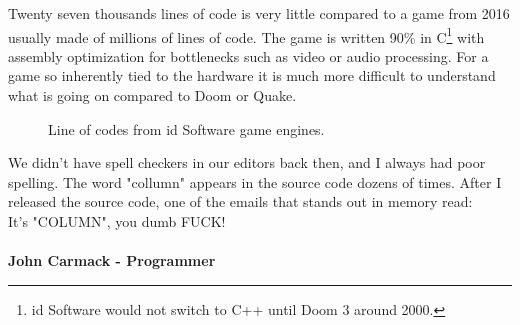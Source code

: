 \documentclass[book.tex]{subfiles}
\begin{document}
\par
Twenty seven thousands lines of code is very little compared to a game from 2016 usually made of millions of lines of code. The game is written 90\% in C\footnote{id Software would not switch to C++ until Doom 3 around 2000.} with assembly optimization for bottlenecks such as video or audio processing. For a game so inherently tied to the hardware it is much more difficult to understand what is going on compared to Doom or Quake.\\
\par
\begin{figure}[H]
\centering
   \caption{Line of codes from id Software game engines.}
 \end{figure}
 
\par

 \begin{fancyquotes}
   We didn't have spell checkers in our editors back then, and I always had poor spelling.  The word "collumn" appears in the source code dozens of times.  After I released the source code, one of the emails that stands out in memory read:
 \bigskip \\
It's "COLUMN", you dumb FUCK!\\
 \bigskip \\
\textbf{John Carmack - Programmer}
 \end{fancyquotes}
 
\end{document}
